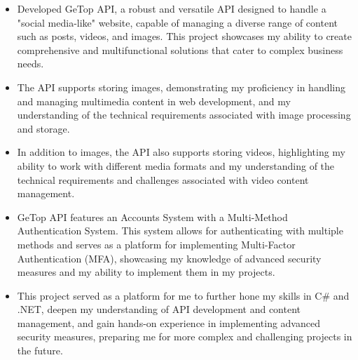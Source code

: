 \documentclass[10pt,a4paper]{altacv}
\begin{document}
\begin{itemize}
    \item Developed GeTop API, a robust and versatile API designed to handle a "social media-like" website, capable of managing a diverse range of content such as posts, videos, and images. This project showcases my ability to create comprehensive and multifunctional solutions that cater to complex business needs.
    \item The API supports storing images, demonstrating my proficiency in handling and managing multimedia content in web development, and my understanding of the technical requirements associated with image processing and storage.
    \item In addition to images, the API also supports storing videos, highlighting my ability to work with different media formats and my understanding of the technical requirements and challenges associated with video content management.
    \item GeTop API features an Accounts System with a Multi-Method Authentication System. This system allows for authenticating with multiple methods and serves as a platform for implementing Multi-Factor Authentication (MFA), showcasing my knowledge of advanced security measures and my ability to implement them in my projects.
    \item This project served as a platform for me to further hone my skills in C\# and .NET, deepen my understanding of API development and content management, and gain hands-on experience in implementing advanced security measures, preparing me for more complex and challenging projects in the future.
\end{itemize}

\divider
\end{document}
